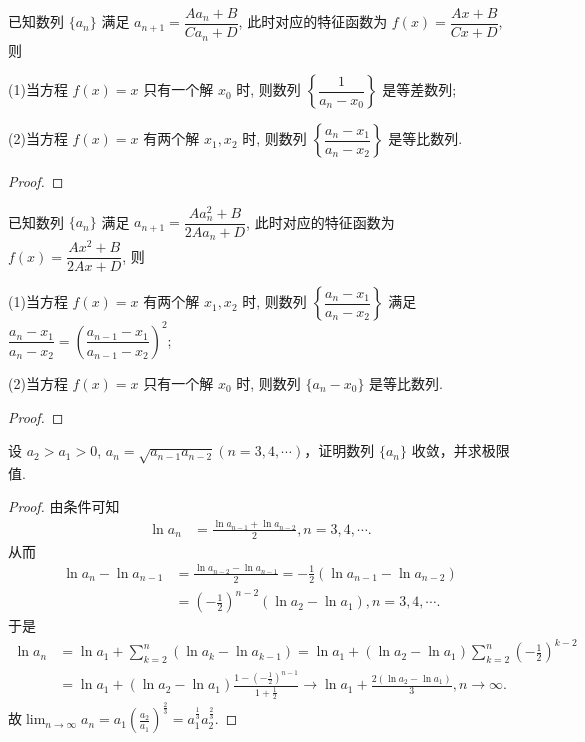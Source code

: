 \documentclass[../../main.tex]{subfiles}
\begin{document}
\begin{proposition}\label{proposition:可直接求通项--类型三}
已知数列 $\{a_n\}$ 满足 $a_{n + 1} = \dfrac{A a_n + B}{C a_n + D}$, 此时对应的特征函数为 $f(x) = \dfrac{A x + B}{C x + D}$, 则

(1)当方程 $f(x) = x$ 只有一个解 $x_0$ 时, 则数列 $\left\{ \dfrac{1}{a_n - x_0} \right\}$ 是等差数列; 

(2)当方程 $f(x) = x$ 有两个解 $x_1, x_2$ 时, 则数列 $\left\{ \dfrac{a_n - x_1}{a_n - x_2} \right\}$ 是等比数列.
\end{proposition}
\begin{proof}

\end{proof}

\begin{proposition}\label{proposition:可直接求通项--类型四}
已知数列 $\{a_n\}$ 满足 $a_{n + 1} = \dfrac{A a_n^2 + B}{2 A a_n + D}$, 此时对应的特征函数为 $f(x) = \dfrac{A x^2 + B}{2 A x + D}$, 则

(1)当方程 $f(x) = x$ 有两个解 $x_1, x_2$ 时, 则数列 $\left\{ \dfrac{a_n - x_1}{a_n - x_2} \right\}$ 满足 $\dfrac{a_n - x_1}{a_n - x_2} = \left( \dfrac{a_{n - 1} - x_1}{a_{n - 1} - x_2} \right)^2$; 

(2)当方程 $f(x) = x$ 只有一个解 $x_0$ 时, 则数列 $\{a_n - x_0\}$ 是等比数列.
\end{proposition}
\begin{proof}

\end{proof}



\begin{example}
设 $a_2 > a_1 > 0$, $a_n = \sqrt{a_{n - 1}a_{n - 2}}(n = 3, 4, \cdots)$，证明数列 $\{a_n\}$ 收敛，并求极限值.
\end{example}
\begin{proof}
由条件可知
\begin{align*}
\ln a_n&=\frac{\ln a_{n-1}+\ln a_{n-2}}{2},n=3,4,\cdots .
\end{align*}
从而
\begin{align*}
\ln a_n-\ln a_{n-1}&=\frac{\ln a_{n-2}-\ln a_{n-1}}{2}=-\frac{1}{2}\left( \ln a_{n-1}-\ln a_{n-2} \right) 
\\
&=\left( -\frac{1}{2} \right) ^{n-2}\left( \ln a_2-\ln a_1 \right) ,n=3,4,\cdots .
\end{align*}
于是
\begin{align*}
\ln a_n&=\ln a_1+\sum_{k=2}^n{\left( \ln a_k-\ln a_{k-1} \right)}=\ln a_1+\left( \ln a_2-\ln a_1 \right) \sum_{k=2}^n{\left( -\frac{1}{2} \right) ^{k-2}}
\\
&=\ln a_1+\left( \ln a_2-\ln a_1 \right) \frac{1-\left( -\frac{1}{2} \right) ^{n-1}}{1+\frac{1}{2}}\rightarrow \ln a_1+\frac{2\left( \ln a_2-\ln a_1 \right)}{3},n\rightarrow \infty .
\end{align*}
故$\lim_{n\rightarrow \infty}a_n=a_1\left( \frac{a_2}{a_1} \right) ^{\frac{2}{3}}=a_{1}^{\frac{1}{3}}a_{2}^{\frac{2}{3}}.$
\end{proof}
\end{document}
